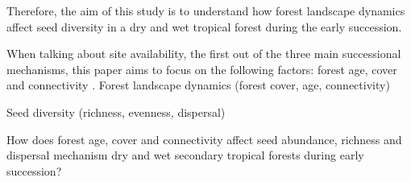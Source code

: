 Therefore, the aim of this study is to understand how forest landscape dynamics affect seed diversity in a dry and wet tropical forest during the early succession. 

When talking about site availability, the first out of the three main successional mechanisms, this paper aims to focus on the following factors: forest age, cover and connectivity \citep{poorterComprehensiveFrameworkVegetation2024}.
Forest landscape dynamics (forest cover, age, connectivity)

Seed diversity (richness, evenness, dispersal)



How does forest age, cover and connectivity affect seed abundance, richness and dispersal mechanism dry and wet secondary tropical forests during early succession?